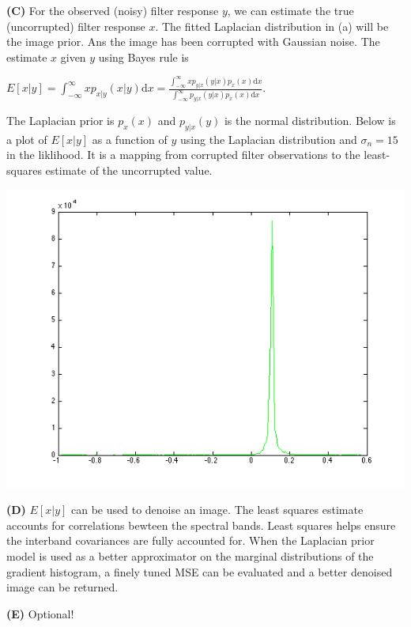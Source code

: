 \documentclass[12pt,twoside]{article}
\begin{document}
\textbf{(C)} For the observed (noisy) filter response $y$, we can estimate the true (uncorrupted) filter response $x$.  The fitted Laplacian distribution in (a) will be the image prior. Ans the image has been corrupted with Gaussian noise.  The estimate $x$ given $y$ using Bayes rule is 
\newline
\begin{center}
$E[x|y] = \int_{-\infty}^{\infty} xp_{x|y}(x|y)\mathrm{d}x = \frac{\int_{-\infty}^{\infty} xp_{y|x}(y|x)p_{x}(x)\mathrm{d}x}{\int_{-\infty}^{\infty} p_{y|x}(y|x)p_{x}(x)\mathrm{d}x}$.
\end{center}

The Laplacian prior is $p_{x}(x)$ and $p_{y|x}(y)$ is the normal distribution.  Below is a plot of $E[x|y]$ as a function of $y$ using the Laplacian distribution and $\sigma_n = 15$ in the liklihood. It is a mapping from corrupted filter observations to the least-squares estimate of the uncorrupted value.

    \includegraphics[scale=.5]{Exy} 
  \newline

\textbf{(D)} $E[x|y]$ can be used to denoise an image.  The least squares estimate accounts for correlations bewteen the spectral bands.  Least squares helps ensure the interband covariances are fully accounted for.  When the Laplacian prior model is used as a better approximator on the marginal distributions of the gradient histogram, a finely tuned MSE can be evaluated and a better denoised image can be returned.
\newline

\textbf{(E)} Optional!
\end{document}
